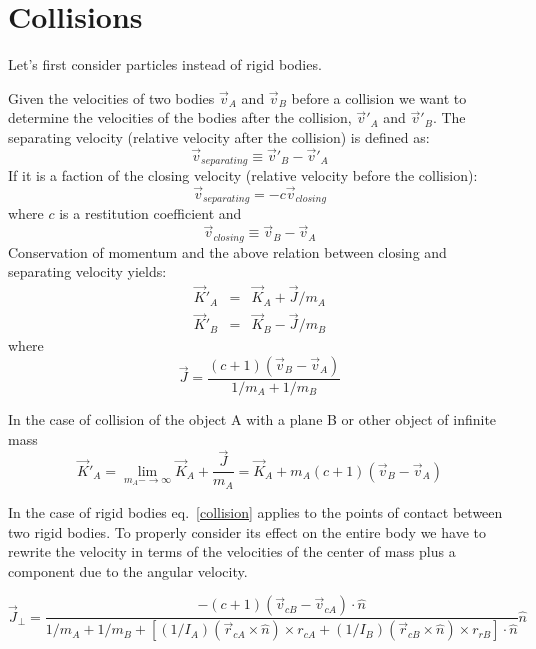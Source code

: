 \documentclass[12pt]{article}
\begin{document}
\section{Collisions}

Let's first consider particles instead of rigid bodies.

Given the velocities of two bodies $\vec v_A$ and $\vec v_B$ before a collision we want to determine the velocities of the bodies after the collision, $\vec v'_A$ and $\vec v'_B$. The separating velocity (relative velocity after the collision) is defined as:
\begin{equation}
\vec v_{separating} \equiv \vec v'_B - \vec v'_A
\end{equation}
If it is a faction of the closing velocity (relative velocity before the collision):
\begin{equation}
\vec v_{separating} = -c \vec v_{closing}
\label{collision}
\end{equation}
where $c$ is a restitution coefficient and
\begin{equation}
\vec v_{closing} \equiv \vec v_B - \vec v_A
\end{equation}
Conservation of momentum and the above relation between closing and separating velocity yields:
\begin{eqnarray}
\vec K'_A &=& \vec K_A + \vec J/{m_A} \\
\vec K'_B &=& \vec K_B - \vec J/{m_B} 
\end{eqnarray}
where
\begin{equation}
\vec J = \frac{(c+1)(\vec v_B-\vec v_A)}{1/m_A+1/m_B}
\end{equation}

In the case of collision of the object A with a plane B or other object of infinite mass
\begin{equation}
\vec K'_A = \lim_{m_A-\rightarrow \infty} \vec K_A + \frac{\vec J}{m_A} = \vec K_A + m_A (c+1)(\vec v_B-\vec v_A)
\end{equation}

In the case of rigid bodies eq.~\ref{collision} applies to the points of contact between two rigid bodies. To properly consider its effect on the entire body we have to rewrite the velocity in terms of the velocities of the center of mass plus a component due to the angular velocity.

\begin{equation}
{\vec J}_{\perp} = \frac {-(c+1) (\vec v_{cB} - \vec v_{cA}) \cdot \hat n}{1/m_A+1/m_B + \left[ (1/I_A)(\vec r_{cA} \times \hat n)\times r_{cA}  + (1/I_B)(\vec r_{cB} \times \hat n) \times r_{rB}\right] \cdot {\hat n}}{\hat n}
\label{impulse}
\end{equation}
\end{document}
